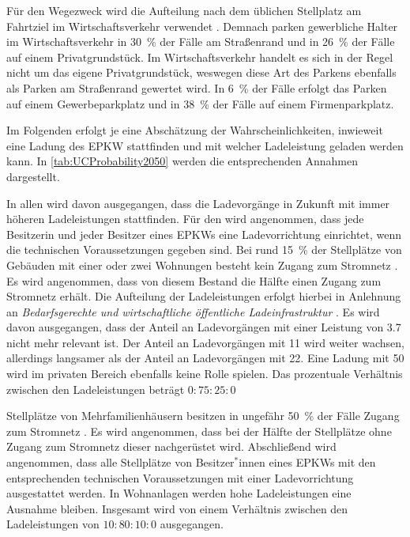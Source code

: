 Für den Wegezweck \dienst wird die Aufteilung nach dem üblichen Stellplatz am Fahrtziel im Wirtschaftsverkehr verwendet \cite{Rikus2015}.
Demnach parken gewerbliche Halter im Wirtschaftsverkehr in \SI{30}{\percent} der Fälle am Straßenrand und in \SI{26}{\percent} der Fälle auf einem Privatgrundstück.
Im Wirtschaftsverkehr handelt es sich in der Regel nicht um das eigene Privatgrundstück, weswegen diese Art des Parkens ebenfalls als Parken am Straßenrand gewertet wird.
In \SI{6}{\percent} der Fälle erfolgt das Parken auf einem Gewerbeparkplatz und in \SI{38}{\percent} der Fälle auf einem Firmenparkplatz.\medskip

Im Folgenden erfolgt je \UC eine Abschätzung der Wahrscheinlichkeiten, inwieweit eine Ladung des \gls{EPKW} stattfinden und mit welcher Ladeleistung geladen werden kann.
In \autoref{tab:UCProbability2050} werden die entsprechenden Annahmen dargestellt.



In allen \UCs wird davon ausgegangen, dass die Ladevorgänge in Zukunft mit immer höheren Ladeleistungen stattfinden.
Für den \UC \Eigenheim wird angenommen, dass jede Besitzerin und jeder Besitzer eines \glspl{EPKW} eine Ladevorrichtung einrichtet, wenn die technischen Voraussetzungen gegeben sind.
Bei rund \SI{15}{\percent} der Stellplätze von Gebäuden mit einer oder zwei Wohnungen besteht kein Zugang zum Stromnetz \cite{dena2020}.
Es wird angenommen, dass von diesem Bestand die Hälfte einen Zugang zum Stromnetz erhält.
Die Aufteilung der Ladeleistungen erfolgt hierbei in Anlehnung an \textit{Bedarfsgerechte und wirtschaftliche öffentliche Ladeinfrastruktur} \cite{NPZMAVE2020}.
Es wird davon ausgegangen, dass der Anteil an Ladevorgängen mit einer Leistung von \SI{3.7}{\kw} nicht mehr relevant ist.
Der Anteil an Ladevorgängen mit \SI{11}{\kw} wird weiter wachsen, allerdings langsamer als der Anteil an Ladevorgängen mit \SI{22}{\kw}.
Eine Ladung mit \SI{50}{\kw} wird im privaten Bereich ebenfalls keine Rolle spielen.
Das prozentuale Verhältnis zwischen den Ladeleistungen beträgt \(0:75:25:0\)\medskip

Stellplätze von Mehrfamilienhäusern besitzen in ungefähr \SI{50}{\percent} der Fälle Zugang zum Stromnetz \cite{dena2020}.
Es wird angenommen, dass bei der Hälfte der Stellplätze ohne Zugang zum Stromnetz dieser nachgerüstet wird.
Abschließend wird angenommen, dass alle Stellplätze von Besitzer$^*$innen eines \glspl{EPKW} mit den entsprechenden technischen Voraussetzungen mit einer Ladevorrichtung ausgestattet werden.
In Wohnanlagen werden hohe Ladeleistungen eine Ausnahme bleiben.
Insgesamt wird von einem Verhältnis zwischen den Ladeleistungen von \(10:80:10:0\) ausgegangen.\medskip

